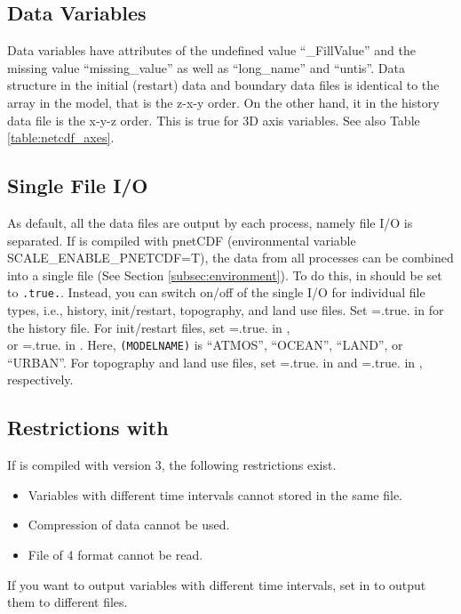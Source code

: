 \subsection{Data Variables}
Data variables have attributes of the undefined value ``\_FillValue'' and 
the missing value ``missing\_value'' as well as ``long\_name'' and ``untis''.
Data structure in the initial (restart) data and boundary data files 
is identical to the array in the model, that is the z-x-y order.
On the other hand, it in the history data file is the x-y-z order.
This is true for 3D axis variables.
See also Table \ref{table:netcdf_axes}.



\subsection{Single File I/O} \label{subsec:single_io}
As default, all the data files are output by each process, namely file I/O is separated.
If \scalerm is compiled with pnetCDF (environmental variable SCALE\_ENABLE\_PNETCDF=T),
the data from all processes can be combined into a single file (See Section \ref{subsec:environment}).
To do this,  in  should be set to \verb|.true.|.
Instead, you can switch on/off of the single I/O for individual file types, i.e., history, init/restart, topography, and land use files.
Set =.true. in  for the history file.
For init/restart files, set =.true. in ,\\
or =.true. in .
Here, \verb|(MODELNAME)| is ``ATMOS'', ``OCEAN'', ``LAND'', or ``URBAN''.
For topography and land use files, set =.true. in  and =.true. in , respectively.


\subsection{Restrictions with }
If \scale is compiled with \netcdf version 3, the following restrictions exist.
\begin{itemize}
\item Variables with different time intervals cannot stored in the same file.
\item Compression of data cannot be used.
\item File of {\netcdf}4 format cannot be read.
\end{itemize}
If you want to output variables with different time intervals, set  in  to output them to different files.


